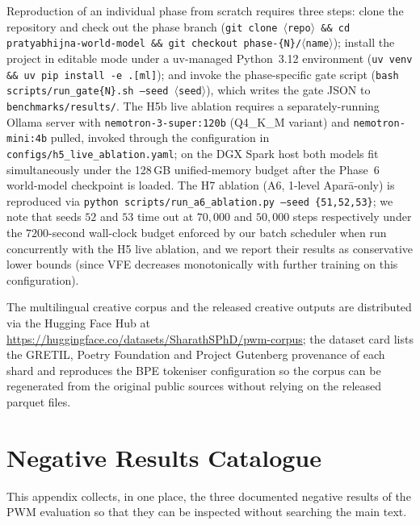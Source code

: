 \documentclass[journal,onecolumn,11pt]{IEEEtran}
\begin{document}
Reproduction of an individual phase from scratch requires three steps:
clone the repository and check out the phase branch
(\texttt{git clone $\langle$repo$\rangle$ \&\& cd pratyabhijna-world-model
\&\& git checkout phase-\{N\}/$\langle$name$\rangle$});
install the project in editable mode under a uv-managed Python~3.12
environment (\texttt{uv venv \&\& uv pip install -e .[ml]});
and invoke the phase-specific gate script
(\texttt{bash scripts/run\_gate\{N\}.sh --seed $\langle$seed$\rangle$}),
which writes the gate JSON to \texttt{benchmarks/results/}.
The H5b live ablation requires a separately-running Ollama server with
\texttt{nemotron-3-super:120b} (Q4\_K\_M variant) and
\texttt{nemotron-mini:4b} pulled, invoked through the configuration in
\texttt{configs/h5\_live\_ablation.yaml}; on the DGX Spark host both models
fit simultaneously under the 128\,GB unified-memory budget after the
Phase~6 world-model checkpoint is loaded.
The H7 ablation (A6, 1-level Aparā-only) is reproduced via
\texttt{python scripts/run\_a6\_ablation.py --seed \{51,52,53\}}; we note
that seeds $52$ and $53$ time out at $70{,}000$ and $50{,}000$ steps
respectively under the $7200$-second wall-clock budget enforced by our
batch scheduler when run concurrently with the H5 live ablation, and we
report their results as conservative lower bounds (since VFE decreases
monotonically with further training on this configuration).

The multilingual creative corpus and the released creative outputs are
distributed via the Hugging Face Hub at
\url{https://huggingface.co/datasets/SharathSPhD/pwm-corpus};
the dataset card lists the GRETIL, Poetry Foundation and Project Gutenberg
provenance of each shard and reproduces the BPE tokeniser configuration so
the corpus can be regenerated from the original public sources without
relying on the released parquet files.

\section{Negative Results Catalogue}\label{app:negative}

This appendix collects, in one place, the three documented negative results
of the PWM evaluation so that they can be inspected without searching the
main text.
\end{document}
